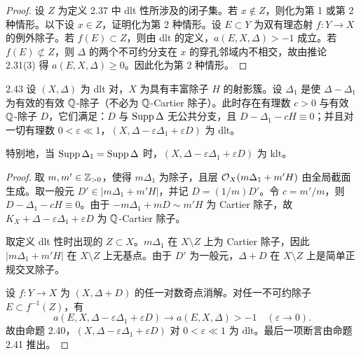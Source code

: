 
\begin{proof}
设 $Z$ 为定义 2.37 中 dlt 性所涉及的闭子集。若 $x\notin Z$，则化为第 1 或第 2 种情形。以下设 $x\in Z$，证明化为第 2 种情形。设 $E\subset Y$ 为双有理态射 $f:Y\to X$ 的例外除子。若 $f(E)\subset Z$，则由 dlt 的定义，$a(E,X,\Delta)>-1$ 成立。若 $f(E)\not\subset Z$，则 $\Delta$ 的两个不可约分支在 $x$ 的穿孔邻域内不相交，故由推论 2.31(3) 得 $a(E,X,\Delta)\ge 0$。因此化为第 2 种情形。
\end{proof}

\begin{propositionp}{2.43}
设 $(X,\Delta)$ 为 dlt 对，$X$ 为具有丰富除子 $H$ 的射影簇。设 $\Delta_1$ 是使 $\Delta-\Delta_1$ 为有效的有效 $\mathbb{Q}$-除子（不必为 $\mathbb{Q}$-Cartier 除子）。此时存在有理数 $c>0$ 与有效 $\mathbb{Q}$-除子 $D$，它们满足：$D$ 与 $\operatorname{Supp}\Delta$ 无公共分支，且 $D-\Delta_1-cH\equiv 0$；并且对一切有理数 $0<\varepsilon\ll 1$，$(X,\Delta-\varepsilon\Delta_1+\varepsilon D)$ 为 dlt。

特别地，当 $\operatorname{Supp}\Delta_1=\operatorname{Supp}\Delta$ 时，$(X,\Delta-\varepsilon\Delta_1+\varepsilon D)$ 为 klt。
\end{propositionp}

\begin{proof}
取 $m,m'\in\mathbb{Z}_{>0}$，使得 $m\Delta_1$ 为除子，且层 $\mathcal{O}_X(m\Delta_1+m'H)$ 由全局截面生成。取一般元 $D'\in|m\Delta_1+m'H|$，并记 $D=(1/m)D'$。令 $c=m'/m$，则 $D-\Delta_1-cH\equiv 0$。由于 $-m\Delta_1+mD\sim m'H$ 为 Cartier 除子，故 $K_X+\Delta-\varepsilon\Delta_1+\varepsilon D$ 为 $\mathbb{Q}$-Cartier 除子。

取定义 dlt 性时出现的 $Z\subset X$。$m\Delta_1$ 在 $X\setminus Z$ 上为 Cartier 除子，因此 $|m\Delta_1+m'H|$ 在 $X\setminus Z$ 上无基点。由于 $D'$ 为一般元，$\Delta+D$ 在 $X\setminus Z$ 上是简单正规交叉除子。

设 $f:Y\to X$ 为 $(X,\Delta+D)$ 的任一对数奇点消解。对任一不可约除子 $E\subset f^{-1}(Z)$，有
\[
a(E,X,\Delta-\varepsilon\Delta_1+\varepsilon D)\longrightarrow a(E,X,\Delta)>-1\quad(\varepsilon\to 0).
\]
故由命题 2.40，$(X,\Delta-\varepsilon\Delta_1+\varepsilon D)$ 对 $0<\varepsilon\ll 1$ 为 dlt。最后一项断言由命题 2.41 推出。
\end{proof}


